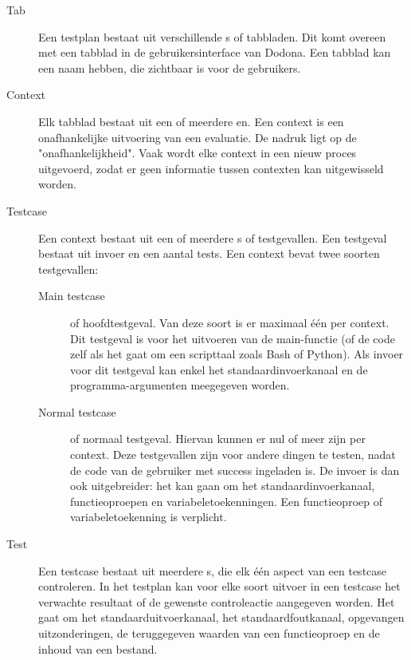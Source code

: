 \begin{description}
    \item[Tab] Een testplan bestaat uit verschillende s of tabbladen.
               Dit komt overeen met een tabblad in de gebruikersinterface van Dodona.
               Een tabblad kan een naam hebben, die zichtbaar is voor de gebruikers.
    \item[Context] Elk tabblad bestaat uit een of meerdere en.
                   Een context is een onafhankelijke uitvoering van een evaluatie.
                   De nadruk ligt op de "onafhankelijkheid".
                   Vaak wordt elke context in een nieuw proces uitgevoerd, zodat er geen informatie tussen contexten kan uitgewisseld worden.
    \item[Testcase] Een context bestaat uit een of meerdere s of testgevallen.
                    Een testgeval bestaat uit invoer en een aantal tests.
                    Een context bevat twee soorten testgevallen:
                    \begin{description}
                        \item[Main testcase] of hoofdtestgeval.
                        Van deze soort is er maximaal één per context.
                        Dit testgeval is voor het uitvoeren van de main-functie (of de code zelf als het gaat om een scripttaal zoals Bash of Python).
                        Als invoer voor dit testgeval kan enkel het standaardinvoerkanaal en de programma-argumenten meegegeven worden.
                        \item[Normal testcase] of normaal testgeval.
                        Hiervan kunnen er nul of meer zijn per context.
                        Deze testgevallen zijn voor andere dingen te testen, nadat de code van de gebruiker met success ingeladen is.
                        De invoer is dan ook uitgebreider: het kan gaan om het standaardinvoerkanaal, functieoproepen en variabeletoekenningen.
                        Een functieoproep of variabeletoekenning is verplicht.
                    \end{description}
    \item[Test] Een testcase bestaat uit meerdere s, die elk één aspect van een testcase controleren.
                In het testplan kan voor elke soort uitvoer in een testcase het verwachte resultaat of de gewenste controleactie aangegeven worden.
                Het gaat om het standaarduitvoerkanaal, het standaardfoutkanaal, opgevangen uitzonderingen, de teruggegeven waarden van een functieoproep en de inhoud van een bestand.
\end{description}

